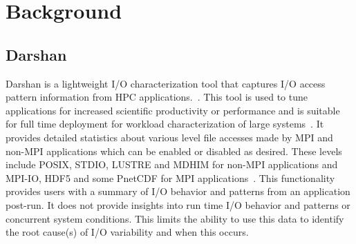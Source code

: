 \section{Background}
\label{sec:background}
\subsection{Darshan}
Darshan is a lightweight I/O characterization tool that captures I/O access pattern information from HPC applications.~\cite{Darshan}.
This tool is used to tune applications for increased scientific productivity or performance and is suitable for full time deployment for workload characterization of large systems~\cite{darshan-webpage}. It provides detailed statistics about various level file accesses made by MPI and non-MPI applications which can be enabled or disabled as desired. These levels include POSIX, STDIO, LUSTRE and MDHIM for non-MPI applications and MPI-IO, HDF5 and some PnetCDF for MPI applications~\cite{darshan-runtime}. This functionality provides users with a summary of I/O behavior and patterns from an application post-run. It does not provide insights into run time I/O behavior and patterns or concurrent system conditions. This limits the ability to use this data to identify the root cause(s) of I/O variability and when this occurs. 

